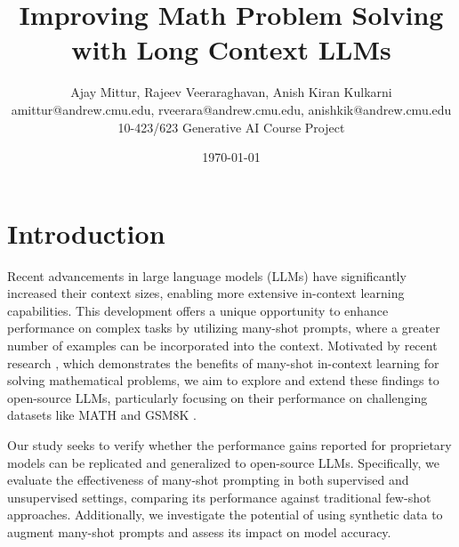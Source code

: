 \documentclass[twocolumn,11pt]{article}
\begin{document}
\title{Improving Math Problem Solving with Long Context LLMs}
\author{Ajay Mittur, Rajeev Veeraraghavan, Anish Kiran Kulkarni \\
amittur@andrew.cmu.edu, rveerara@andrew.cmu.edu, anishkik@andrew.cmu.edu\\
10-423/623 Generative AI Course Project}
\date{\today}
\maketitle




\section{Introduction}

Recent advancements in large language models (LLMs) have significantly increased their context sizes, enabling more extensive in-context learning capabilities. This development offers a unique opportunity to enhance performance on complex tasks by utilizing many-shot prompts, where a greater number of examples can be incorporated into the context. Motivated by recent research \cite{agarwal2024manyshotincontextlearning}, which demonstrates the benefits of many-shot in-context learning for solving mathematical problems, we aim to explore and extend these findings to open-source LLMs, particularly focusing on their performance on challenging datasets like MATH \cite{hendrycksmath2021} and GSM8K \cite{cobbe2021gsm8k}.

Our study seeks to verify whether the performance gains reported for proprietary models can be replicated and generalized to open-source LLMs. Specifically, we evaluate the effectiveness of many-shot prompting in both supervised and unsupervised settings, comparing its performance against traditional few-shot approaches. Additionally, we investigate the potential of using synthetic data to augment many-shot prompts and assess its impact on model accuracy.
\end{document}
